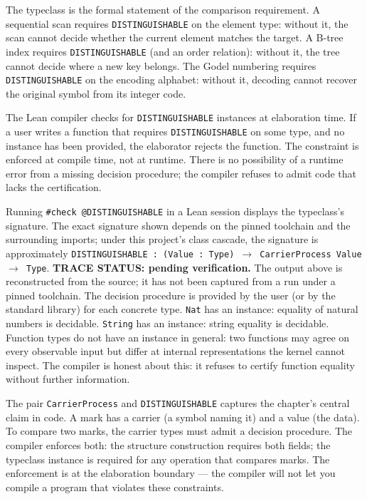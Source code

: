 The typeclass is the formal statement of the comparison requirement. A
sequential scan requires \texttt{DISTINGUISHABLE} on the element type:
without it, the scan cannot decide whether the current element matches the
target. A B-tree index requires \texttt{DISTINGUISHABLE} (and an order
relation): without it, the tree cannot decide where a new key belongs. The
Godel numbering requires \texttt{DISTINGUISHABLE} on the encoding alphabet:
without it, decoding cannot recover the original symbol from its integer
code.

The Lean compiler checks for \texttt{DISTINGUISHABLE} instances at
elaboration time. If a user writes a function that requires
\texttt{DISTINGUISHABLE} on some type, and no instance has been provided,
the elaborator rejects the function. The constraint is enforced at compile
time, not at runtime. There is no possibility of a runtime error from a
missing decision procedure; the compiler refuses to admit code that lacks
the certification.

Running \texttt{\#check @DISTINGUISHABLE} in a Lean session displays the
typeclass's signature. The exact signature shown depends on the pinned
toolchain and the surrounding imports; under this project's class
cascade, the signature is approximately
\texttt{DISTINGUISHABLE : (Value : Type) $\to$ CarrierProcess Value $\to$ Type}.
\textbf{TRACE STATUS: pending verification.} The output above is
reconstructed from the source; it has not been captured from a
run under a pinned toolchain. The decision procedure is provided by
the user (or by the standard library) for each concrete type.
\texttt{Nat} has an instance: equality of natural numbers is
decidable. \texttt{String} has an instance: string equality is decidable.
Function types do not have an instance in general: two functions may agree
on every observable input but differ at internal representations the kernel
cannot inspect. The compiler is honest about this: it refuses to certify
function equality without further information.

The pair \texttt{CarrierProcess} and \texttt{DISTINGUISHABLE} captures the
chapter's central claim in code. A mark has a carrier (a symbol naming
it) and a value (the data). To compare two marks, the carrier types must
admit a decision procedure. The compiler enforces both: the structure
construction requires both fields; the typeclass instance is required for
any operation that compares marks. The enforcement is at the elaboration
boundary --- the compiler will not let you compile a program that violates
these constraints.

